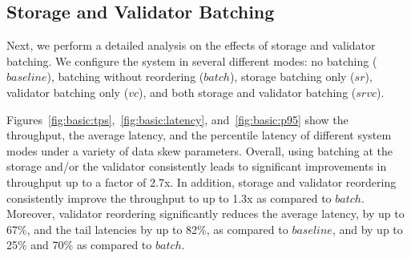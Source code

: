 \subsection{Storage and Validator Batching}
\label{subsec:experiment:batching}

Next, we perform a detailed analysis on the effects of storage and validator batching. We configure the system in several different modes: no batching ($baseline$), batching without reordering ($batch$), storage batching only ($sr$), validator batching only
($vc$), and both storage and validator batching ($srvc$).




Figures~\ref{fig:basic:tps},~\ref{fig:basic:latency}, and~\ref{fig:basic:p95} show the throughput, the average latency, and the percentile latency of different system modes under a variety of data skew parameters. Overall, using batching at the storage and/or the validator consistently leads to significant improvements in throughput up to a factor of 2.7x. In addition, storage and validator reordering consistently improve the throughput to up to 1.3x as compared to $batch$. Moreover, validator reordering significantly reduces the average latency, by up to 67\%, and the tail latencies by up to 82\%, as compared to $baseline$, and by up to 25\% and 70\% as compared to $batch$.

